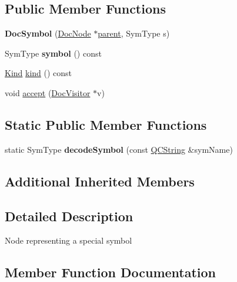 \subsection*{Public Member Functions}
\begin{DoxyCompactItemize}
\item 
\mbox{\label{class_doc_symbol_abb5e5a543fcc160981cd239248f5de40}} 
{\bfseries Doc\+Symbol} (\mbox{\hyperlink{class_doc_node}{Doc\+Node}} $\ast$\mbox{\hyperlink{class_doc_node_a73e8ad29a91cfceb0968eb00db71a23d}{parent}}, Sym\+Type s)
\item 
\mbox{\label{class_doc_symbol_ab1515ee01e367634026acfc75dcab5ac}} 
Sym\+Type {\bfseries symbol} () const
\item 
\mbox{\hyperlink{class_doc_node_aebd16e89ca590d84cbd40543ea5faadb}{Kind}} \mbox{\hyperlink{class_doc_symbol_a721838cea5944bbdc1b8dfddc0242062}{kind}} () const
\item 
void \mbox{\hyperlink{class_doc_symbol_ab7e27f7abdd4004918f6b39c09a05fd8}{accept}} (\mbox{\hyperlink{class_doc_visitor}{Doc\+Visitor}} $\ast$v)
\end{DoxyCompactItemize}
\subsection*{Static Public Member Functions}
\begin{DoxyCompactItemize}
\item 
\mbox{\label{class_doc_symbol_ae9924eba60c6ee0590b1fa8be11a7b0e}} 
static Sym\+Type {\bfseries decode\+Symbol} (const \mbox{\hyperlink{class_q_c_string}{Q\+C\+String}} \&sym\+Name)
\end{DoxyCompactItemize}
\subsection*{Additional Inherited Members}


\subsection{Detailed Description}
Node representing a special symbol 

\subsection{Member Function Documentation}
\mbox{\label{class_doc_symbol_ab7e27f7abdd4004918f6b39c09a05fd8}} 
